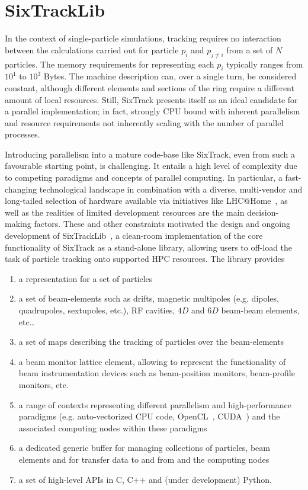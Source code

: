 \documentclass{ws-ijmpa}
\begin{document}
\section{SixTrackLib}
In the context of single-particle simulations, tracking requires no interaction between the calculations carried out for particle $p_i$ and $p_{j\neq i}$ from a set of $N$ 
particles. The memory requirements for representing each $p_i$ typically ranges from $10^1$ to $10^3$ Bytes. The machine description can, over a single turn, be considered 
constant, although different elements and sections of the ring require a different amount of local resources. Still, SixTrack presents itself as an ideal candidate for a 
parallel implementation; in fact, strongly CPU bound with inherent parallelism and resource requirements not inherently scaling with the number of parallel processes. 

Introducing parallelism into a mature code-base like SixTrack, even from such a favourable starting point, is challenging. It entails a high level of complexity due to 
competing paradigms and concepts of parallel computing. In particular, a fast-changing technological landscape in combination with a diverse, multi-vendor and long-tailed 
selection of hardware available via initiatives like LHC@Home~\cite{lhcathome}, as well as the realities of limited development resources are the main decision-making factors. 
These and other constraints motivated the design and ongoing development of SixTrackLib~\cite{sixtracklib}, a clean-room implementation of the core functionality of SixTrack as
a stand-alone library, allowing users to off-load the task of particle tracking onto supported HPC resources. The library provides 
\begin{enumerate}[label=(\alph*)]
 \item a representation for a set of particles 
 \item a set of beam-elements such as drifts, magnetic multipoles (e.g. dipoles, quadrupoles, sextupoles, etc.), RF cavities, $4D$ and $6D$ beam-beam elements, etc\ldots 
 \item a set of maps describing the tracking of particles over the beam-elements
 \item a beam monitor lattice element, allowing to represent the functionality of beam instrumentation devices such as beam-position monitors, beam-profile monitors, etc.
 \item a range of contexts representing different parallelism and high-performance paradigms (e.g. auto-vectorized CPU code, OpenCL~\cite{opencl}, CUDA~\cite{cuda}) and the 
       associated computing nodes within these paradigms
 \item a dedicated generic buffer for managing collections of particles, beam elements and for transfer data to and from and the computing nodes 
 \item a set of high-level APIs in C, C++ and (under development) Python.
\end{enumerate}
\end{document}

